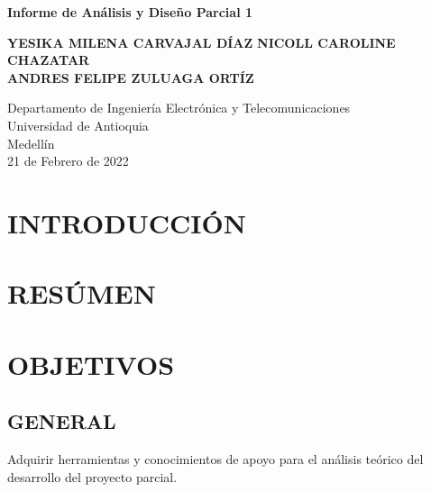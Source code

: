 \documentclass{article}
\begin{document}
\begin{titlepage}
    \begin{center}
        \vspace*{1cm}
            
        \Huge
        \textbf{Informe de Análisis y Diseño Parcial 1}
            
        \vspace{0.5cm}
        \LARGE
            
        \vspace{1.5cm}
            
        \textbf{YESIKA MILENA CARVAJAL DÍAZ}
        \textbf{NICOLL CAROLINE CHAZATAR}\\
        \textbf{ANDRES FELIPE ZULUAGA ORTÍZ}
            
        \vfill
            
        \vspace{0.8cm}
            
        \Large
        Departamento de Ingeniería Electrónica y Telecomunicaciones\\
        Universidad de Antioquia\\
        Medellín\\
        21 de Febrero de 2022
            
    \end{center}
\end{titlepage}

\tableofcontents
\newpage

\section{INTRODUCCIÓN}

\section{RESÚMEN}

\section{OBJETIVOS}

\subsection{GENERAL}

Adquirir herramientas y conocimientos de apoyo para el análisis teórico del desarrollo del proyecto parcial.
\end{document}
